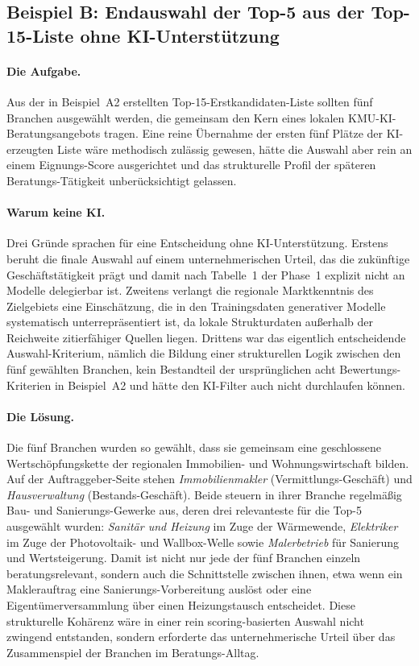 \documentclass[a4paper,11pt]{article}
\begin{document}
\subsection{Beispiel B: Endauswahl der Top-5 aus der Top-15-Liste ohne KI-Unterstützung}

\paragraph{Die Aufgabe.}
Aus der in Beispiel~A2 erstellten Top-15-Erstkandidaten-Liste sollten
fünf Branchen ausgewählt werden, die gemeinsam den Kern eines lokalen
KMU-KI-Beratungsangebots tragen. Eine reine Übernahme der ersten fünf
Plätze der KI-erzeugten Liste wäre methodisch zulässig gewesen, hätte
die Auswahl aber rein an einem Eignungs-Score ausgerichtet und das
strukturelle Profil der späteren Beratungs-Tätigkeit unberücksichtigt
gelassen.

\paragraph{Warum keine KI.}
Drei Gründe sprachen für eine Entscheidung ohne KI-Unterstützung.
Erstens beruht die finale Auswahl auf einem unternehmerischen Urteil,
das die zukünftige Geschäftstätigkeit prägt und damit nach Tabelle~1
der Phase~1 explizit nicht an Modelle delegierbar ist. Zweitens
verlangt die regionale Marktkenntnis des Zielgebiets eine
Einschätzung, die in den Trainingsdaten generativer Modelle
systematisch unterrepräsentiert ist, da lokale Strukturdaten
außerhalb der Reichweite zitierfähiger Quellen liegen. Drittens war
das eigentlich entscheidende Auswahl-Kriterium, nämlich die Bildung
einer strukturellen Logik zwischen den fünf gewählten Branchen, kein
Bestandteil der ursprünglichen acht Bewertungs-Kriterien in
Beispiel~A2 und hätte den KI-Filter auch nicht durchlaufen können.

\paragraph{Die Lösung.}
Die fünf Branchen wurden so gewählt, dass sie gemeinsam eine
geschlossene Wertschöpfungskette der regionalen Immobilien- und
Wohnungswirtschaft bilden. Auf der Auftraggeber-Seite stehen
\emph{Immobilien\-makler} (Vermittlungs-Geschäft) und
\emph{Hausverwaltung} (Bestands-Geschäft). Beide steuern in ihrer
Branche regelmäßig Bau- und Sanierungs-Gewerke aus, deren drei
relevanteste für die Top-5 ausgewählt wurden: \emph{Sanitär und
Heizung} im Zuge der Wärmewende, \emph{Elektriker} im Zuge der
Photovoltaik- und Wallbox-Welle sowie \emph{Malerbetrieb} für
Sanierung und Wertsteigerung. Damit ist nicht nur jede der fünf
Branchen einzeln beratungsrelevant, sondern auch die Schnittstelle
zwischen ihnen, etwa wenn ein Maklerauftrag eine
Sanierungs-Vorbereitung auslöst oder eine Eigentümerversammlung über
einen Heizungs\-tausch entscheidet. Diese strukturelle Kohärenz wäre
in einer rein scoring-basierten Auswahl nicht zwingend entstanden,
sondern erforderte das unternehmerische Urteil über das Zusammenspiel
der Branchen im Beratungs-Alltag.
\end{document}
